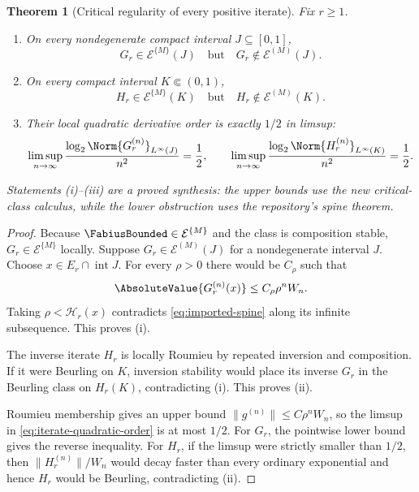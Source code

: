 \documentclass[11pt,a4paper]{article}
\newtheorem{theorem}{Theorem}[section]
\theoremstyle{definition}
\theoremstyle{remark}
\newcommand{\Roumieu}[1]{\mathcal{E}^{\{#1\}}}
\newcommand{\Beurling}[1]{\mathcal{E}^{(#1)}}
\begin{document}
\begin{theorem}[Critical regularity of every positive iterate]
\label{thm:iterate-criticality}
Fix $r\ge1$.
\begin{enumerate}[label=(\roman*)]
\item On every nondegenerate compact interval $J\subseteq[0,1]$,
\begin{equation}
  G_r\in\Roumieu{M}(J)
  \quad\text{but}\quad
  G_r\notin\Beurling{M}(J).
  \label{eq:forward-critical}
\end{equation}
\item On every compact interval $K\Subset(0,1)$,
\begin{equation}
  H_r\in\Roumieu{M}(K)
  \quad\text{but}\quad
  H_r\notin\Beurling{M}(K).
  \label{eq:inverse-iterate-critical}
\end{equation}
\item Their local quadratic derivative order is exactly $1/2$ in limsup:
\begin{equation}
 \limsup_{n\to\infty}
 \frac{\log_2\Norm{G_r^{(n)}}_{L^\infty(J)}}{n^2}
 =\frac12,
 \qquad
 \limsup_{n\to\infty}
 \frac{\log_2\Norm{H_r^{(n)}}_{L^\infty(K)}}{n^2}
 =\frac12.
 \label{eq:iterate-quadratic-order}
\end{equation}
\end{enumerate}
Statements (i)--(iii) are a \emph{proved synthesis}: the upper bounds use the new
critical-class calculus, while the lower obstruction uses the repository's
spine theorem.
\end{theorem}

\begin{proof}
Because $\FabiusBounded\in\Roumieu{M}$ and the class is composition stable,
$G_r\in\Roumieu{M}$ locally.  Suppose $G_r\in\Beurling{M}(J)$ for a
nondegenerate interval $J$.  Choose $x\in E_r\cap\operatorname{int}J$.
For every $\rho>0$ there would be $C_\rho$ such that
\[
  \AbsoluteValue{G_r^{(n)}(x)}\le C_\rho\rho^nW_n.
\]
Taking $\rho<\mathcal H_r(x)$ contradicts \eqref{eq:imported-spine} along its
infinite subsequence.  This proves (i).

The inverse iterate $H_r$ is locally Roumieu by repeated inversion and composition.
If it were Beurling on $K$, inversion stability would place its inverse $G_r$ in the
Beurling class on $H_r(K)$, contradicting (i).  This proves (ii).

Roumieu membership gives an upper bound
$\|g^{(n)}\|\le C\rho^nW_n$, so the limsup in \eqref{eq:iterate-quadratic-order}
is at most $1/2$.  For $G_r$, the pointwise lower bound gives the reverse inequality.
For $H_r$, if the limsup were strictly smaller than $1/2$, then
$\|H_r^{(n)}\|/W_n$ would decay faster than every ordinary exponential and hence
$H_r$ would be Beurling, contradicting (ii).
\end{proof}
\end{document}
